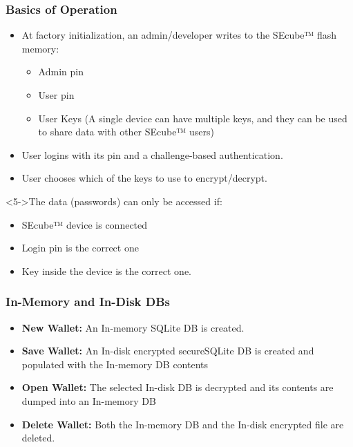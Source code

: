 \documentclass[14pt,usenames,dvipsnames]{beamer}
\begin{document}
\begin{frame}
	\frametitle{Basics of Operation}
	
	\begin{itemize}
	 \item<2-> At factory initialization, an admin/developer writes to the SEcube™ flash memory:
	   \begin{itemize}
	     \item<2-> Admin pin
	     \item<2-> User pin
	     \item<2-> User Keys (A single device can have multiple keys, and they can be used to share data with other SEcube™ users)
	   \end{itemize}
	 \item<3-> User logins with its pin and a challenge-based authentication.
	 \item<4-> User chooses which of the keys to use to encrypt/decrypt.	  
	\end{itemize}
	
\begin{alertblock}<5->{The data (passwords) can only be accessed if:}
 \begin{itemize}
       \setlength\itemsep{-3pt}
	     \item<2-> SEcube™ device is connected
	     \item<2-> Login pin is the correct one
	     \item<2-> Key inside the device is the correct one.
	   \end{itemize}
\end{alertblock}	
	
\end{frame}

\begin{frame}
	\frametitle{In-Memory and In-Disk DBs}
  \begin{itemize}
  \setlength\itemsep{10pt}
    \item<2-> \textbf{New Wallet:} An In-memory SQLite DB is created.
    \item<3-> \textbf{Save Wallet:} An In-disk encrypted secureSQLite DB is created and populated with the In-memory DB contents
    \item<4-> \textbf{Open Wallet:} The selected In-disk DB is decrypted and its contents are dumped into an In-memory DB
    \item<5-> \textbf{Delete Wallet:} Both the In-memory DB and the In-disk encrypted file are deleted.
  \end{itemize}
\end{frame}
\end{document}

